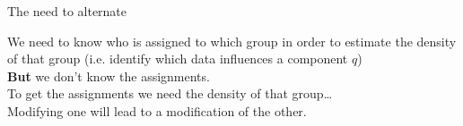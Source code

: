 \begin{frame}{\subsecname}

\begin{block}{The need to alternate}

We need to know who is assigned to which group in order to estimate the density of that group (i.e. identify which data influences a component $q$)\\
\textbf{But} we don't know the assignments.\\
To get the assignments we need the density of that group\ldots\\

Modifying one will lead to a modification of the other.

\end{block}

\pause


\end{frame}
